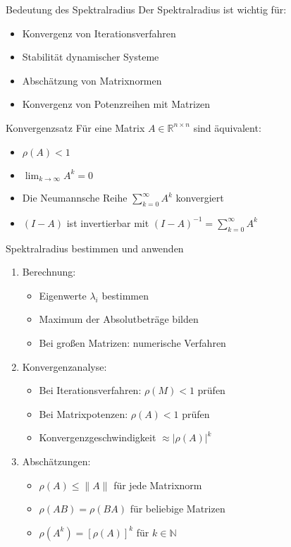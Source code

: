 \begin{concept}{Bedeutung des Spektralradius}
Der Spektralradius ist wichtig für:
\begin{itemize}
    \item Konvergenz von Iterationsverfahren
    \item Stabilität dynamischer Systeme 
    \item Abschätzung von Matrixnormen
    \item Konvergenz von Potenzreihen mit Matrizen
\end{itemize}
\end{concept}
\begin{theorem}{Konvergenzsatz}
Für eine Matrix $A \in \mathbb{R}^{n\times n}$ sind äquivalent:
\begin{itemize}
    \item $\rho(A) < 1$
    \item $\lim_{k\to\infty} A^k = 0$
    \item Die Neumannsche Reihe $\sum_{k=0}^\infty A^k$ konvergiert
    \item $(I-A)$ ist invertierbar mit $(I-A)^{-1} = \sum_{k=0}^\infty A^k$
\end{itemize}
\end{theorem}

\begin{KR}{Spektralradius bestimmen und anwenden}
\begin{enumerate}
    \item Berechnung:
    \begin{itemize}
        \item Eigenwerte $\lambda_i$ bestimmen
        \item Maximum der Absolutbeträge bilden
        \item Bei großen Matrizen: numerische Verfahren
    \end{itemize}
    
    \item Konvergenzanalyse:
    \begin{itemize}
        \item Bei Iterationsverfahren: $\rho(M) < 1$ prüfen
        \item Bei Matrixpotenzen: $\rho(A) < 1$ prüfen
        \item Konvergenzgeschwindigkeit $\approx |\rho(A)|^k$
    \end{itemize}
    
    \item Abschätzungen:
    \begin{itemize}
        \item $\rho(A) \leq \|A\|$ für jede Matrixnorm
        \item $\rho(AB) = \rho(BA)$ für beliebige Matrizen
        \item $\rho(A^k) = [\rho(A)]^k$ für $k \in \mathbb{N}$
    \end{itemize}
\end{enumerate}
\end{KR}

